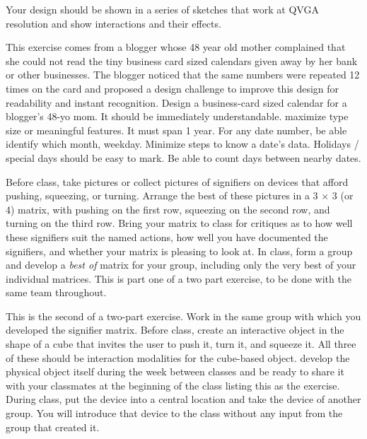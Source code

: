 Your design should be shown in a series of sketches that work at QVGA
resolution and show interactions and their effects.

\hypertarget{business-card-calendar}{%
\label{business-card-calendar}}

This exercise comes from a blogger whose 48 year old mother complained
that she could not read the tiny business card sized calendars given
away by her bank or other businesses. The blogger noticed that the same
numbers were repeated 12 times on the card and proposed a design
challenge to improve this design for readability and instant
recognition. Design a business-card sized calendar for a blogger's 48-yo
mom. It should be immediately understandable. maximize type size or
meaningful features. It must span 1 year. For any date number, be able
identify which month, weekday. Minimize steps to know a date's data.
Holidays / special days should be easy to mark. Be able to count days
between nearby dates.

\hypertarget{signifier-matrix}{%
\label{signifier-matrix}}

Before class, take pictures or collect pictures of signifiers on devices
that afford pushing, squeezing, or turning. Arrange the best of these
pictures in a 3 \(\times\) 3 (or 4) matrix, with pushing on the first
row, squeezing on the second row, and turning on the third row. Bring
your matrix to class for critiques as to how well these signifiers suit
the named actions, how well you have documented the signifiers, and
whether your matrix is pleasing to look at. In class, form a group and
develop a \emph{best of} matrix for your group, including only the very
best of your individual matrices. This is part one of a two part
exercise, to be done with the same team throughout.

\hypertarget{signifier-device}{%
\label{signifier-device}}

This is the second of a two-part exercise. Work in the same group with
which you developed the signifier matrix. Before class, create an
interactive object in the shape of a cube that invites the user to push
it, turn it, and squeeze it. All three of these should be interaction
modalities for the cube-based object. develop the physical object itself
during the week between classes and be ready to share it with your
classmates at the beginning of the class listing this as the exercise.
During class, put the device into a central location and take the device
of another group. You will introduce that device to the class without
any input from the group that created it.

